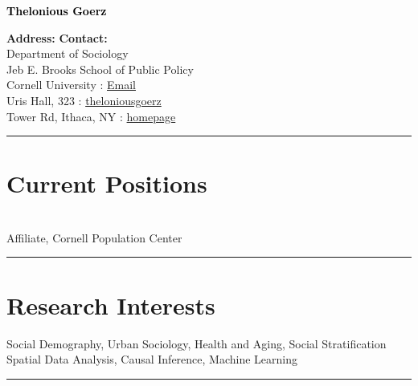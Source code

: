 \documentclass[11pt]{article} %
\begin{document}
\begin{center}
{\Huge\bfseries \textcolor{black}{Thelonious Goerz}} \\
\end{center}

\bigskip 

\textbf{Address:} \hfill \textbf{Contact:} \\
Department of Sociology \\
Jeb E. Brooks School of Public Policy \\ 
Cornell University \hfill {} : \href{mailto:theloniouslgoerz@gmail.com}{Email}\\ %
Uris Hall, 323  \hfill {} : \href{https://github.com/theloniousgoerz/}{theloniousgoerz}\\ %
Tower Rd, Ithaca, NY \hfill {} : \href{theloniousgoerz.github.io}{homepage} \\
\noindent\rule{16cm}{0.4pt}

\vspace{0.001\textheight} %




\section*{Current Positions}

  \\
\hspace*{10mm} Affiliate, Cornell Population Center \\
\noindent\rule{16cm}{0.4pt}

\section*{Research Interests}

\large{} Social Demography, Urban Sociology, Health and Aging, Social Stratification \\
\large{} Spatial Data Analysis, Causal Inference, Machine Learning \\
\noindent\rule{16cm}{0.4pt}
\end{document}
